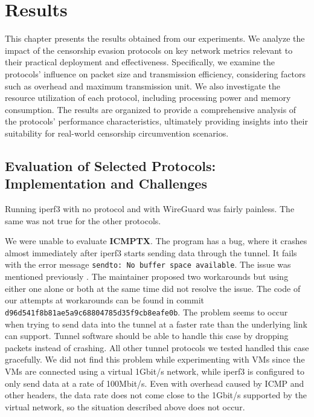 
\chapter{Results}
\label{chap:results}

This chapter presents the results obtained from our experiments.
We analyze the impact of the censorship evasion protocols on key network metrics relevant to their practical deployment and effectiveness.
Specifically, we examine the protocols' influence on packet size and transmission efficiency, considering factors such as overhead and maximum transmission unit.
We also investigate the resource utilization of each protocol, including processing power and memory consumption.
The results are organized to provide a comprehensive analysis of the protocols' performance characteristics, ultimately providing insights into their suitability for real-world censorship circumvention scenarios.


\section{Evaluation of Selected Protocols: Implementation and Challenges}
Running iperf3 with no protocol and with WireGuard was fairly painless.
The same was not true for the other protocols.

We were unable to evaluate \textbf{ICMPTX}.
The program has a bug, where it crashes almost immediately after iperf3 starts sending data through the tunnel.
It fails with the error message \texttt{sendto: No buffer space available}.
The issue was mentioned previously \cite{icmptx-sendto-no-buffer-space-avaiable}.
The maintainer proposed two workarounds but using either one alone or both at the same time did not resolve the issue.
The code of our attempts at workarounds can be found in commit \texttt{d96d541f8b81ae5a9c68804785d35f9cb8eafe0b}.
The problem seems to occur when trying to send data into the tunnel at a faster rate than the underlying link can support.
Tunnel software should be able to handle this case by dropping packets instead of crashing.
All other tunnel protocols we tested handled this case gracefully.
We did not find this problem while experimenting with VMs since the VMs are connected using a virtual 1Gbit/s network, while iperf3 is configured to only send data at a rate of 100Mbit/s.
Even with overhead caused by ICMP and other headers, the data rate does not come close to the 1Gbit/s supported by the virtual network, so the situation described above does not occur.

